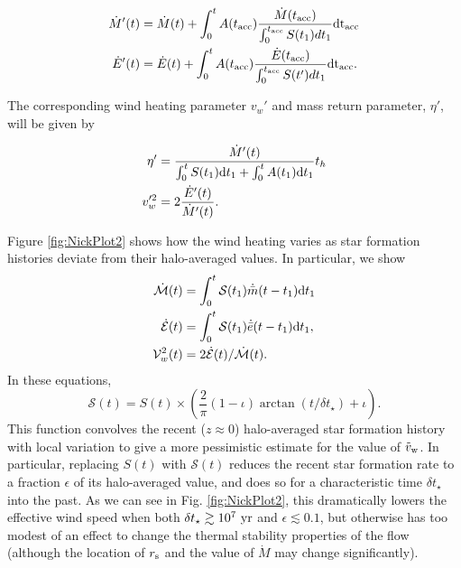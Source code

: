 \begin{align}
\dot{M} '(t)&=\dot{M}(t)+\int_{0}^{t} A(t_{\rm acc}) \frac{\dot{M}(t_{\rm acc})}
{\int_{0}^{t_{\rm acc}} S(t_1) dt_1} {\rm dt_{ acc}}\\
\dot{E}'(t)&=\dot{E}(t)+\int_{0}^{t} A(t_{\rm acc}) \frac{\dot{E}(t_{\rm acc})}
{\int_{0}^{t_{\rm acc}} S(t') dt_1} {\rm dt_{acc}}.
\end{align}

The corresponding wind heating parameter $v_w'$ and mass return
parameter, $\eta'$, will be given by

\begin{align}
\eta'&=\frac{\dot{M}'(t)}{\int_0^t S(t_1) {\rm d}t_1+\int_0^t A(t_1) {\rm
    d}t_1} t_h\\
v_w'^2&=2 \frac{\dot{E}'(t)}{\dot{M}'(t)}.
\end{align}

Figure \ref{fig:NickPlot2} shows how the wind heating varies as star formation histories deviate from their halo-averaged values.  In particular, we show
\begin{align} 
  \dot{\mathcal{M}}(t) &= \int_0^t \mathcal{S}(t_1) \dot{\bar{m}}(t-t_1){\rm
      d}t_1\\
  \dot{\mathcal{E}}(t) &= \int_0^t \mathcal{S}(t_1) \dot{\bar{e}}(t-t_1){\rm
      d}t_1,\\
  \mathcal{V}_w^2(t) &=2 \dot{\mathcal{E}}(t)/\dot{\mathcal{M}}(t).
\end{align}
In these equations, 
\begin{equation}
\mathcal{S}(t) = S(t) \times
\left(\frac{2}{\pi}(1-\iota)\arctan(t/\delta t_{\star}) + \iota
\right).
\label{eq:sfrPerturbed}
\end{equation}
This function convolves the recent ($z \approx 0$) halo-averaged star
formation history with local variation to give a more pessimistic
estimate for the value of $\tilde{v}_{\rm w}$.  In particular,
replacing $S(t)$ with $\mathcal{S}(t)$ reduces the recent star
formation rate to a fraction $\epsilon$ of its halo-averaged value,
and does so for a characteristic time $\delta t_{\star}$ into the
past.  As we can see in Fig. \ref{fig:NickPlot2}, this dramatically
lowers the effective wind speed when both $\delta t_{\star} \gtrsim
10^7 ~{\rm yr}$ and $\epsilon \lesssim 0.1$, but otherwise has too
modest of an effect to change the thermal stability properties of the
flow (although the location of $r_{\rm s}$ and the value of $\dot{M}$
may change significantly).


